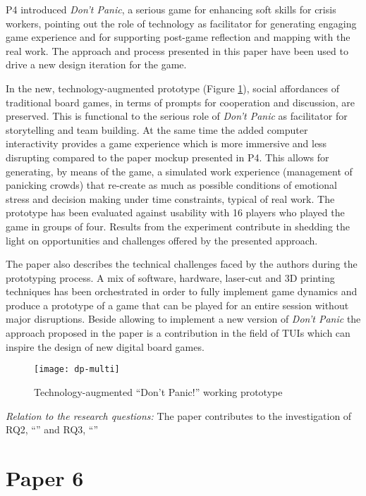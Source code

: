 P4 introduced \emph{Don't Panic}, a serious game for enhancing soft skills for crisis workers, pointing out the role of technology as facilitator for generating engaging game experience and for supporting post-game reflection and mapping with the real work. The approach and process presented in this paper have been used to drive a new design iteration for the game. 

In the new, technology-augmented prototype (Figure \ref{fig:dp-token}), social affordances of traditional board games, in terms of prompts for cooperation and discussion, are preserved. This is functional to the serious role of \emph{Don't Panic} as facilitator for storytelling and team building. At the same time the added computer interactivity provides a game experience which is more immersive and less disrupting compared to the paper mockup presented in P4. This allows for generating, by means of the game, a simulated work experience (management of panicking crowds) that re-create as much as possible conditions of emotional stress and decision making under time constraints, typical of real work. The prototype has been evaluated against usability with 16 players who played the game in groups of four. Results from the experiment contribute in shedding the light on opportunities and challenges offered by the presented approach.

The paper also describes the technical challenges faced by the authors during the prototyping process. A mix of software, hardware, laser-cut and 3D printing techniques has been orchestrated in order to fully implement game dynamics and produce a prototype of a game that can be played for an entire session without major disruptions. Beside allowing to implement a new version of \emph{Don't Panic} the approach proposed in the paper is a contribution in the field of TUIs which can inspire the design of new digital board games.

\begin{figure}
	[tbh] \centering 
	\texttt{[image: dp-multi]} \caption{Technology-augmented “Don't Panic!” working prototype} \label{fig:dp-token} 
\end{figure}

\emph{Relation to the research questions: } The paper contributes to the investigation of RQ2, ``\RQii'' and RQ3, ``\RQiii''

\section[P6: Context Becomes Content: Sensor Data for Computer-Supported Reflective Learning]{Paper 6}\label{paper-6}

